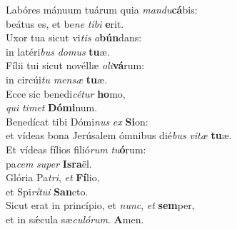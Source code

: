 \evenverse Labóres mánuum tuárum quia \textit{man}\textit{du}\textbf{cá}bis:~\*\\
\evenverse beátus es, et be\textit{ne} \textit{ti}\textit{bi} \textbf{e}rit.\\
\oddverse Uxor tua sicut vi\textit{tis} \textit{a}\textbf{bún}dans:~\*\\
\oddverse in latéri\textit{bus} \textit{do}\textit{mus} \textbf{tu}æ.\\
\evenverse Fílii tui sicut novéllæ \textit{o}\textit{li}\textbf{vá}rum:~\*\\
\evenverse in circúi\textit{tu} \textit{men}\textit{sæ} \textbf{tu}æ.\\
\oddverse Ecce sic benedi\textit{cé}\textit{tur} \textbf{ho}mo,~\*\\
\oddverse \textit{qui} \textit{ti}\textit{met} \textbf{Dó}\textbf{mi}num.\\
\evenverse Benedícat tibi Dómi\textit{nus} \textit{ex} \textbf{Si}on:~\*\\
\evenverse et vídeas bona Jerúsalem ómnibus dié\textit{bus} \textit{vi}\textit{tæ} \textbf{tu}æ.\\
\oddverse Et vídeas fílios filió\textit{rum} \textit{tu}\textbf{ó}rum:~\*\\
\oddverse pa\textit{cem} \textit{su}\textit{per} \textbf{Is}\textbf{ra}ël.\\
\evenverse Glória Pa\textit{tri}, \textit{et} \textbf{Fí}lio,~\*\\
\evenverse et Spi\textit{rí}\textit{tu}\textit{i} \textbf{San}cto.\\
\oddverse Sicut erat in princípio, et \textit{nunc}, \textit{et} \textbf{sem}per,~\*\\
\oddverse et in sǽcula sæ\textit{cu}\textit{ló}\textit{rum}. \textbf{A}men.\\
